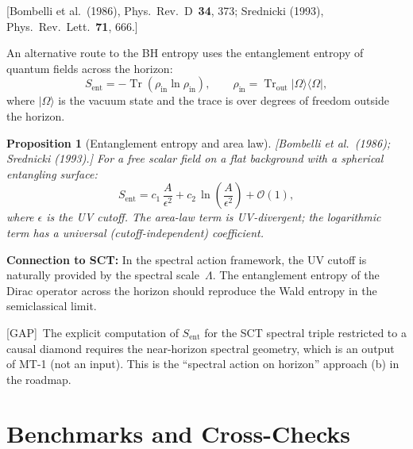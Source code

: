 \documentclass[12pt,a4paper]{article}
\newtheorem{proposition}{Proposition}[section]
\theoremstyle{definition}
\theoremstyle{remark}
\newcommand{\Tr}{\operatorname{Tr}}
\newcommand{\fromlit}[1]{\textcolor{blue!70!black}{\textsf{[#1]}}}
\newcommand{\gap}{\textcolor{red!80!black}{\textsf{[GAP]}}}
\begin{document}
\fromlit{Bombelli et al.\ (1986), Phys.\ Rev.\ D~\textbf{34}, 373;
Srednicki (1993), Phys.\ Rev.\ Lett.~\textbf{71}, 666.}

An alternative route to the BH entropy uses the entanglement entropy
of quantum fields across the horizon:
\begin{equation}
  S_{\mathrm{ent}} = -\Tr(\rho_{\mathrm{in}}\ln\rho_{\mathrm{in}}),
  \qquad
  \rho_{\mathrm{in}} = \Tr_{\mathrm{out}}
  |\Omega\rangle\langle\Omega|,
\end{equation}
where $|\Omega\rangle$ is the vacuum state and the trace is over
degrees of freedom outside the horizon.

\begin{proposition}[Entanglement entropy and area law]
\fromlit{Bombelli et al.\ (1986); Srednicki (1993).}
For a free scalar field on a flat background with a spherical
entangling surface:
\begin{equation}
  S_{\mathrm{ent}} = c_1\,\frac{A}{\epsilon^2}
  + c_2\,\ln\!\left(\frac{A}{\epsilon^2}\right)
  + \mathcal{O}(1),
\end{equation}
where $\epsilon$ is the UV cutoff.  The area-law term is UV-divergent;
the logarithmic term has a universal (cutoff-independent) coefficient.
\end{proposition}

\textbf{Connection to SCT:} In the spectral action framework, the
UV cutoff is naturally provided by the spectral scale~$\Lambda$.
The entanglement entropy of the Dirac operator across the horizon
should reproduce the Wald entropy in the semiclassical limit.

\gap\ The explicit computation of $S_{\mathrm{ent}}$ for the SCT
spectral triple restricted to a causal diamond requires the
near-horizon spectral geometry, which is an output of MT-1 (not
an input).  This is the ``spectral action on horizon'' approach
(b) in the roadmap.


\section{Benchmarks and Cross-Checks}
\label{sec:benchmarks}
\end{document}
